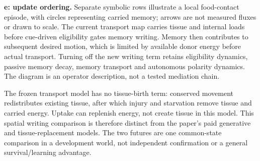 \textbf{e: update ordering.} Separate symbolic rows illustrate a local food-contact episode, with circles representing carried memory; arrows are not measured fluxes or drawn to scale. The current transport map carries tissue and internal loads before cue-driven eligibility gates memory writing. Memory then contributes to subsequent desired motion, which is limited by available donor energy before actual transport. Turning off the new writing term retains eligibility dynamics, passive memory decay, memory transport and autonomous polarity dynamics. The diagram is an operator description, not a tested mediation chain.

The frozen transport model has no tissue-birth term: conserved movement redistributes existing tissue, after which injury and starvation remove tissue and carried energy. Uptake can replenish energy, not create tissue in this model. This spatial writing comparison is therefore distinct from the paper's paid generative and tissue-replacement models. The two futures are one common-state comparison in a development world, not independent confirmation or a general survival/learning advantage.
